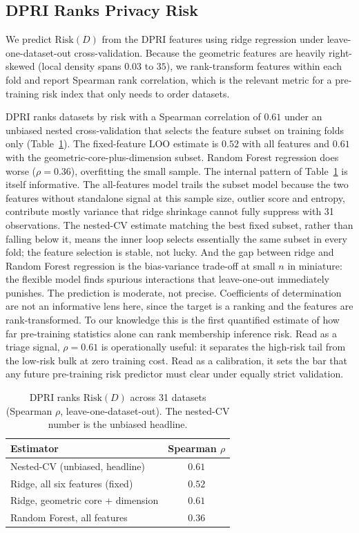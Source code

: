\subsection{DPRI Ranks Privacy Risk}

We predict $\mathrm{Risk}(D)$ from the DPRI features using ridge regression
under leave-one-dataset-out cross-validation. Because the geometric features
are heavily right-skewed (local density spans $0.03$ to $35$), we
rank-transform features within each fold and report Spearman rank
correlation, which is the relevant metric for a pre-training risk index that
only needs to order datasets.

DPRI ranks datasets by risk with a Spearman correlation of $0.61$ under an
unbiased nested cross-validation that selects the feature subset on training
folds only (Table~\ref{tab:regression}). The fixed-feature LOO estimate is
$0.52$ with all features and $0.61$ with the geometric-core-plus-dimension
subset. Random Forest regression does worse ($\rho=0.36$), overfitting the
small sample. The internal pattern of Table~\ref{tab:regression} is
itself informative. The all-features model trails the subset model
because the two features without standalone signal at this sample size,
outlier score and entropy, contribute mostly variance that ridge
shrinkage cannot fully suppress with 31 observations. The nested-CV
estimate matching the best fixed subset, rather than falling below it,
means the inner loop selects essentially the same subset in every fold;
the feature selection is stable, not lucky. And the gap between ridge
and Random Forest regression is the bias-variance trade-off at small
$n$ in miniature: the flexible model finds spurious interactions that
leave-one-out immediately punishes. The prediction is moderate, not
precise. Coefficients of
determination are not an informative lens here, since the target is a
ranking and the features are rank-transformed.
To our knowledge this is the first quantified estimate of how far
pre-training statistics alone can rank membership inference risk. Read as
a triage signal, $\rho=0.61$ is operationally useful: it separates the
high-risk tail from the low-risk bulk at zero training cost. Read as a
calibration, it sets the bar that any future pre-training risk predictor
must clear under equally strict validation.

\begin{table}[t]
\centering
\caption{DPRI ranks $\mathrm{Risk}(D)$ across 31 datasets (Spearman $\rho$,
         leave-one-dataset-out). The nested-CV number is the unbiased
         headline.}
\label{tab:regression}
\small
\begin{tabular}{lc}
\toprule
\textbf{Estimator} & \textbf{Spearman} $\rho$ \\
\midrule
Nested-CV (unbiased, headline)        & $0.61$ \\
Ridge, all six features (fixed)       & $0.52$ \\
Ridge, geometric core + dimension     & $0.61$ \\
Random Forest, all features           & $0.36$ \\
\bottomrule
\end{tabular}
\end{table}


